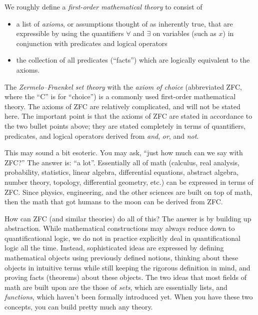 We roughly define a \textit{first-order mathematical theory} to consist of

\begin{itemize}
    \item a list of \textit{axioms}, or assumptions thought of as inherently true, that are expressible by using the quantifiers $\forall$ and $\exists$ on variables (such as $x$) in conjunction with predicates and logical operators
    \item the collection of all predicates (``facts'') which are logically equivalent to the axioms.
\end{itemize}

The \textit{Zermelo–Fraenkel set theory} with the \textit{axiom of choice} (abbreviated ZFC, where the ``C'' is for ``choice'') is a commonly used first-order mathematical theory. The axioms of ZFC are relatively complicated, and will not be stated here. The important point is that the axioms of ZFC are stated in accordance to the two bullet points above; they are stated completely in terms of quantifiers, predicates, and logical operators derived from \textit{and}, \textit{or}, and \textit{not}.

This may sound a bit esoteric. You may ask, ``just how much can we say with ZFC?'' The answer is: ``a lot''. Essentially all of math (calculus, real analysis, probability, statistics, linear algebra, differential equations, abstract algebra, number theory, topology, differential geometry, etc.) can be expressed in terms of ZFC. Since physics, engineering, and the other sciences are built on top of math, then the math that got humans to the moon can be derived from ZFC.

How can ZFC (and similar theories) do all of this? The answer is by building up abstraction. While mathematical constructions may always reduce down to quantificational logic, we do not in practice explicitly deal in quantificational logic all the time. Instead, sophisticated ideas are expressed by defining mathematical objects using previously defined notions, thinking about these objects in intuitive terms while still keeping the rigorous definition in mind, and proving facts (theorems) about these objects. The two ideas that most fields of math are built upon are the those of \textit{sets}, which are essentially lists, and \textit{functions}, which haven't been formally introduced yet. When you have these two concepts, you can build pretty much any theory.

\newpage

